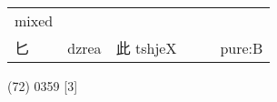 \documentclass[14pt,a4paper]{scrartcl}
\begin{document}
\begin{longtable}[c]{@{}llllll@{}}
\begin{minipage}[t]{0.14\columnwidth}\raggedright\strut
mixed
\strut\end{minipage}\tabularnewline
\begin{minipage}[t]{0.14\columnwidth}\raggedright\strut
匕
\strut\end{minipage} &
\begin{minipage}[t]{0.14\columnwidth}\raggedright\strut
dzrea
\strut\end{minipage} &
\begin{minipage}[t]{0.14\columnwidth}\raggedright\strut
此 tshjeX
\strut\end{minipage} &
\begin{minipage}[t]{0.14\columnwidth}\raggedright\strut
\strut\end{minipage} &
\begin{minipage}[t]{0.14\columnwidth}\raggedright\strut
\strut\end{minipage} &
\begin{minipage}[t]{0.14\columnwidth}\raggedright\strut
pure:B
\strut\end{minipage}\tabularnewline
\bottomrule
\end{longtable}

(72) 0359 {[}3{]}
\end{document}
